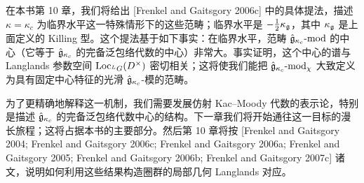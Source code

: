 在本书第 10 章，我们将给出 [Frenkel and Gaitsgory 2006c] 中的具体提法，描述 $\kappa=\kappa_c$ 为临界水平这一特殊情形下的这些范畴；临界水平是 $-\frac{1}{2}\kappa_{\mathfrak{g}}$，其中 $\kappa_{\mathfrak{g}}$ 是上面定义的 Killing 型。这个提法基于如下事实：在临界水平，范畴 $\hat{\mathfrak{g}}_{\kappa_c}\text{-}\mathrm{mod}$ 的中心（它等于 $\hat{\mathfrak{g}}_{\kappa_c}$ 的完备泛包络代数的中心）非常大。事实证明，这个中心的谱与 Langlands 参数空间 $\operatorname{Loc}_{{}^L G}(D^\times)$ 密切相关；这将使我们能把 $\hat{\mathfrak{g}}_{\kappa_c}\text{-}\mathrm{mod}_\chi$ 大致定义为具有固定中心特征的光滑 $\hat{\mathfrak{g}}_{\kappa_c}$-模的范畴。

为了更精确地解释这一机制，我们需要发展仿射 Kac--Moody 代数的表示论，特别是描述 $\hat{\mathfrak{g}}_{\kappa_c}$ 的完备泛包络代数中心的结构。下一章我们将开始通往这一目标的漫长旅程；这将占据本书的主要部分。然后第 10 章将按 [Frenkel and Gaitsgory 2004; Frenkel and Gaitsgory 2006c; Frenkel and Gaitsgory 2006a; Frenkel and Gaitsgory 2005; Frenkel and Gaitsgory 2006b; Frenkel and Gaitsgory 2007c] 诸文，说明如何利用这些结果构造圈群的局部几何 Langlands 对应。


